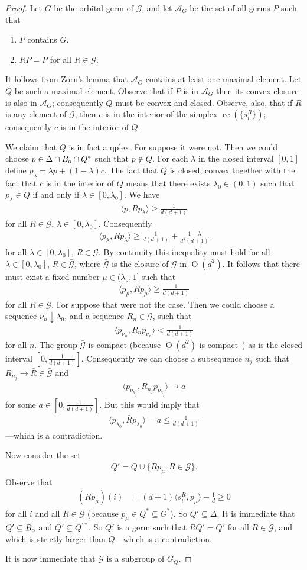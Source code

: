 \documentclass[aps,pra,superscriptaddress,10pt,tightenlines,twocolumn,nofootinbib]{revtex4}
\theoremstyle{remark}
\newcommand{\ea}[1]{\begin{align}#1\end{align}}
\newcommand{\la}{\langle}
\newcommand{\ra}{\rangle}
\newcommand{\ps}{\Delta}
\newcommand{\dl}[1]{#1^{*}}
\newcommand{\bo}{B_{\rm{o}}}
\newcommand{\allgerms}{\mathcal{A}}
\newcommand{\qp}{Q}
\newcommand{\pr}{G}
\newcommand{\gp}{\mathcal{G}}
\newcommand{\qplex}{qplex}
\newcommand{\qgp}[1]{G_{#1}}
\DeclareMathOperator{\Ot}{O}
\DeclareMathOperator{\cc}{cc}
\begin{document}
\begin{proof}
Let $\pr$ be the orbital germ of $\gp$, and let $\allgerms_\pr$ be the set of all germs $P$ such that
\begin{enumerate}
\item $P$ contains $\pr$.
\item $RP=P$ for all $R \in \gp$.
\end{enumerate}
It follows from Zorn's lemma that $\allgerms_\pr$ contains at least one maximal element.  Let $\qp$ be such a maximal element.  Observe that if $P$ is in $\allgerms_\pr$ then its convex closure is also in $\allgerms_\pr$; consequently $\qp$ must be convex and closed.  Observe, also, that if $R$ is any element of $\gp$, then $c$ is in the interior of the simplex $\cc(\{s^R_i\})$; consequently $c$ is in the interior of $\qp$.

 We claim that $\qp$ is in fact a \qplex.  For suppose it were not.  Then we could choose $p \in \ps\cap \bo \cap \dl{\qp}$ such that $p\notin \qp$.  For each $\lambda$ in the closed interval $[0,1]$ define $p_{\lambda}=\lambda p + (1-\lambda) c$.  The fact that $\qp$ is closed, convex together with the fact that $c$ is in the interior of $\qp$ means that there exists $\lambda_0 \in (0,1)$ such that  $p_{\lambda} \in \qp$ if and only if $\lambda \in [0,\lambda_0]$.  We have
\ea{
\la p , Rp_{\lambda} \ra \ge \frac{1}{d(d+1)}
}
for all $R \in \gp$, $\lambda \in [0,\lambda_0]$. Consequently
\ea{
\la  p_{\lambda} , R p_{\lambda} \ra  \ge \frac{1}{d(d+1)} + \frac{1-\lambda}{d^2(d+1)}
}
for all $\lambda \in [0,\lambda_0]$, $R\in \gp$.  By continuity this inequality must hold for all $\lambda \in [0,\lambda_0]$, $R\in \bar{\gp}$, where $\bar{\gp}$ is the closure of $\gp$ in $\Ot(d^2)$.   It follows that there must exist a fixed number $\mu \in (\lambda_0, 1]$ such that
\ea{
\la   p_{\mu} , R p_{\mu}\ra \ge \frac{1}{d(d+1)}
}
for all $R \in \gp$.  For suppose that were not the case.  Then we could choose a sequence $\nu_n \downarrow \lambda_0$, and a sequence $R_n \in \gp$, such that
\ea{
\la  p_{\nu_n} , R_n p_{\nu_n}\ra < \frac{1}{d(d+1)}
}
for all $n$.  The group $\bar{\gp}$ is compact (because $\Ot(d^2)$ is compact~\cite{CompactGroup}) as is the closed interval $\left[0,\frac{1}{d(d+1)}\right]$.  Consequently we can choose a subsequence $n_j$ such that $R_{n_j} \to \bar{R}\in \bar{\gp}$ and
\ea{
\la p_{\nu_{n_j}} , R_{n_j} p_{\nu_{n_j}}\ra \to a
}
for some $a \in \left[0,\frac{1}{d(d+1)}\right]$.  But this would imply that
\ea{
\la p_{\lambda_0} , \bar{R} p_{\lambda_0} \ra  = a \le \frac{1}{d(d+1)}
}
---which is a contradiction.

Now consider the set
\ea{
\qp' = \qp \cup \{R p_{\mu} \colon R \in \gp\}.
}
Observe that \ea{
(Rp_{\mu})(i) &= (d+1)\la s^R_i , p_{\mu}\ra - \frac{1}{d} \ge 0
}
for all $i$ and all $R\in \gp$ (because $p_{\mu} \in \dl{\qp}\subseteq \dl{\pr}$).  So $\qp' \subseteq \ps$.  It is immediate that $\qp'\subseteq \bo$ and $\qp'\subseteq \qp^{\prime *}$.  So $\qp'$ is a germ such that $R\qp' = \qp'$ for all $R\in \gp$, and which is strictly larger than $\qp$---which is a contradiction.

It is now immediate that $\gp$ is a subgroup of $\qgp{\qp}$.
\end{proof}
\end{document}
